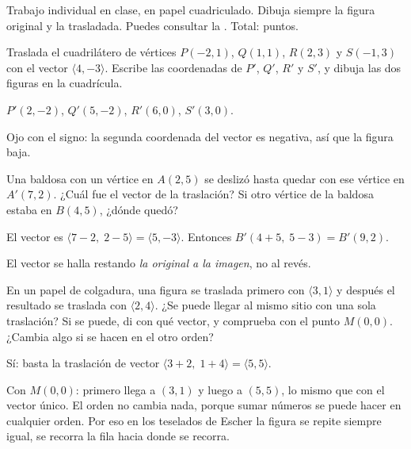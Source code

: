 \documentclass[11pt]{article}
\begin{document}
\encabezado

\begin{instrucciones}
Trabajo individual en clase, en papel cuadriculado. Dibuja siempre la figura original y la
trasladada. Puedes consultar la .
Total: \totalpuntos{} puntos.
\end{instrucciones}

\begin{preguntas}

\pregunta[1.5] Traslada el cuadrilátero de vértices $P(-2, 1)$, $Q(1, 1)$, $R(2, 3)$ y
$S(-1, 3)$ con el vector $\langle 4, -3 \rangle$. Escribe las coordenadas de $P'$, $Q'$, $R'$
y $S'$, y dibuja las dos figuras en la cuadrícula.
\begin{solucion}[5cm]
$P'(2, -2)$, $Q'(5, -2)$, $R'(6, 0)$, $S'(3, 0)$.

Ojo con el signo: la segunda coordenada del vector es negativa, así que la figura baja.
\end{solucion}

\pregunta[1.5] Una baldosa con un vértice en $A(2, 5)$ se deslizó hasta quedar con ese vértice
en $A'(7, 2)$. ¿Cuál fue el vector de la traslación? Si otro vértice de la baldosa estaba en
$B(4, 5)$, ¿dónde quedó?
\begin{solucion}[4cm]
El vector es $\langle 7 - 2,\; 2 - 5 \rangle = \langle 5, -3 \rangle$. Entonces
$B'(4 + 5,\; 5 - 3) = B'(9, 2)$.

El vector se halla restando \emph{la original a la imagen}, no al revés.
\end{solucion}

\pregunta[1] En un papel de colgadura, una figura se traslada primero con
$\langle 3, 1 \rangle$ y después el resultado se traslada con $\langle 2, 4 \rangle$. ¿Se puede
llegar al mismo sitio con una sola traslación? Si se puede, di con qué vector, y comprueba con
el punto $M(0, 0)$. ¿Cambia algo si se hacen en el otro orden?
\begin{solucion}[4.5cm]
Sí: basta la traslación de vector $\langle 3 + 2,\; 1 + 4 \rangle = \langle 5, 5 \rangle$.

Con $M(0,0)$: primero llega a $(3, 1)$ y luego a $(5, 5)$, lo mismo que con el vector único. El
orden no cambia nada, porque sumar números se puede hacer en cualquier orden. Por eso en los
teselados de Escher la figura se repite siempre igual, se recorra la fila hacia donde se recorra.
\end{solucion}


\end{preguntas}
\end{document}
